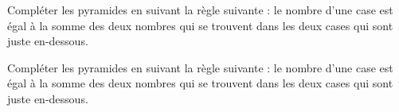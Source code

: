 \begin{exercice*}
    Compléter les pyramides en suivant la règle suivante : le nombre d’une case est égal à la somme
    des deux nombres qui se trouvent dans les deux cases qui sont juste en-dessous.
    \begin{center}

    \end{center}

 \end{exercice*}
\begin{corrige}
    Compléter les pyramides en suivant la règle suivante : le nombre d’une case est égal à la somme
    des deux nombres qui se trouvent dans les deux cases qui sont juste en-dessous.
    \begin{center}

    \end{center}

\end{corrige}
